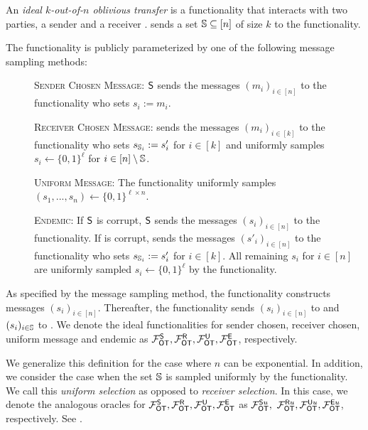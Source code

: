 \begin{definition}\label{def:ot}
An \emph{ideal $k$-out-of-$n$ oblivious transfer} is a functionality that interacts with two parties, a sender \send and a receiver \rec. \rec sends a set $\mathsf{\mathbb S}\subseteq[n]$ of size $k$ to the functionality.

The functionality is publicly parameterized by one of the following message sampling methods:
\begin{description}
\item[] \textsc{Sender Chosen Message:} $\mathsf{S}$ sends the messages $(m_i)_{i\in[n]}$ to the functionality who sets $s_i:=m_i$.

\item[] \textsc{Receiver Chosen Message:} \rec sends the messages $(m_i)_{i\in[k]}$ to the functionality who sets $s_{\mathsf{\mathbb S}_i}:=s'_i$ for $i\in[k]$ and uniformly samples $s_i\gets\{0,1\}^\ell$ for $i\in[n]\setminus\mathsf{\mathbb S}$.

\item[] \textsc{Uniform Message:} The functionality uniformly samples $(s_1,...,s_n)\gets\{0,1\}^{\ell\times n}$. 
 
\item[] \textsc{Endemic:} If $\mathsf{S}$ is corrupt, $\mathsf{S}$ sends the messages $(s_i)_{i\in[n]}$ to the functionality. If \rec is corrupt, \rec sends the messages $(s'_i)_{i\in[n]}$ to the functionality who sets $s_{\mathsf{\mathbb S}_i}:=s'_i$ for $i\in[k]$.
All remaining $s_i$ for $i\in [n]$ are uniformly sampled $s_i\gets\{0,1\}^\ell$ by  the functionality.
\end{description}

As specified by the message sampling method, the functionality constructs messages $(s_i)_{i\in[n]}$. Thereafter, the functionality sends $(s_i)_{i\in[n]}$ to \send and $(s_i)_{i\in \mathsf{\mathbb S}}$ to \rec. We denote the ideal functionalities for sender chosen, receiver chosen, uniform message and endemic as $\mathcal{F}_{\mathsf{OT}}^\mathsf{S}, \mathcal{F}_{\mathsf{OT}}^\mathsf{R},\mathcal{F}_{\mathsf{OT}}^\mathsf{U},\mathcal{F}_{\mathsf{OT}}^\mathsf{E}$, respectively. %
\end{definition}
\begin{remark}
	We generalize this definition for the case where $n$ can be exponential. In addition, we consider the case when the set $\mathsf{\mathbb S}$ is sampled uniformly by the functionality. We call this \emph{uniform selection} as opposed to \emph{receiver selection}. In this case, we denote the analogous oracles for $\mathcal{F}_{\mathsf{OT}}^\mathsf{S}, \mathcal{F}_{\mathsf{OT}}^\mathsf{R},\mathcal{F}_{\mathsf{OT}}^\mathsf{U},\mathcal{F}_{\mathsf{OT}}^\mathsf{E}$ as $\mathcal{F}_{\mathsf{OT}}^{\mathsf{S} u},$ $\mathcal{F}_{\mathsf{OT}}^{\mathsf{R} u}, \mathcal{F}_{\mathsf{OT}}^{\mathsf{U} u}, \mathcal{F}_{\mathsf{OT}}^{\mathsf{E} u}$, respectively. See .
\end{remark}



